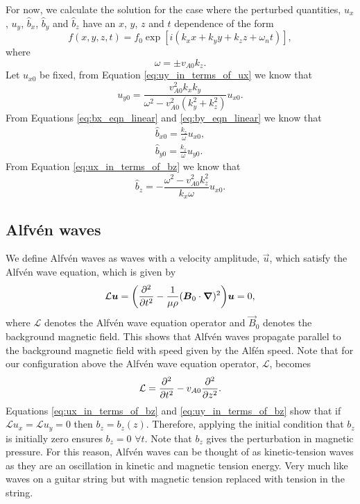 For now, we calculate the solution for the case where the perturbed quantities, $u_x$, $u_y$, $\hat{b}_x$, $\hat{b}_y$ and $\hat{b}_z$ have an $x$, $y$, $z$ and $t$ dependence of the form
\[f(x,y,z,t)=f_0\exp[i(k_xx + k_y y + k_z z + \omega_n t)],\]
where
\[\omega = \pm v_{A0}k_z.\]
Let $u_{x0}$ be fixed, from Equation \eqref{eq:uy_in_terms_of_ux} we know that
\begin{equation}
    \label{eq:uy0}
    u_{y0} = \frac{v_{A0}^2 k_x k_y}{\omega^2 - v_{A0}^2(k_y^2 + k_z^2)}u_{x0}.
\end{equation}
From Equations \eqref{eq:bx_eqn_linear} and \eqref{eq:by_eqn_linear} we know that
\begin{gather}
    \label{eq:bx0}
    \hat{b}_{x0} = \frac{k_z}{\omega}u_{x0}, \\
    \label{eq:by0}
    \hat{b}_{y0} = \frac{k_z}{\omega}u_{y0}.
\end{gather}
From Equation \eqref{eq:ux_in_terms_of_bz} we know that
\begin{equation}
    \label{eq:bz0}
    \hat{b}_z = -\frac{\omega^2 - v_{A0}^2k_z^2}{k_x \omega} u_{x0}.
\end{equation}

\subsection{Alfv\'en waves}

We define Alfv\'en waves \citep{Alfven1942} as waves with a velocity amplitude, $\vec{u}$, which satisfy the Alfv\'en wave equation, which is given by
\begin{equation}
    \label{eq:alfven_wave_equation}
    \mathcal{L}\boldsymbol{u} = \qty(\pdv[2]{}{t} - \frac{1}{\mu\rho}(\boldsymbol{B}_0\cdot\grad)^2)\boldsymbol{u}=0,
\end{equation}
where $\mathcal{L}$ denotes the Alfv\'en wave equation operator and $\vec{B}_0$ denotes the background magnetic field. This shows that Alfv\'en waves propagate parallel to the background magnetic field with speed given by the Alf\'en speed. Note that for our configuration above the Alfv\'en wave equation operator, $\mathcal{L}$, becomes
\begin{equation}
    \label{eq:alfven_wave_equation_operator}
    \mathcal{L} = \pdv[2]{}{t} - v_{A0}\pdv[2]{}{z}.
\end{equation}
Equations \eqref{eq:ux_in_terms_of_bz} and \eqref{eq:uy_in_terms_of_bz} show that if $\mathcal{L}u_x=\mathcal{L}u_y=0$ then $b_z=b_z(z)$. Therefore, applying the initial condition that $b_z$ is initially zero ensures $b_z=0$ $\forall t$. Note that $b_z$ gives the perturbation in magnetic pressure. For this reason, Alfv\'en waves can be thought of as kinetic-tension waves as they are an oscillation in kinetic and magnetic tension energy. Very much like waves on a guitar string but with magnetic tension replaced with tension in the string.

